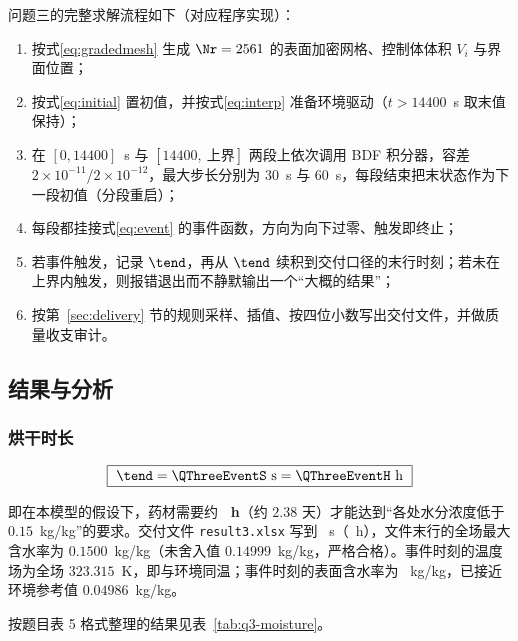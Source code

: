 问题三的完整求解流程如下（对应程序实现）：

\begin{enumerate}
  \item 按式\eqref{eq:gradedmesh} 生成 $\Nr=2561$ 的表面加密网格、控制体体积 $V_i$ 与界面位置；
  \item 按式\eqref{eq:initial} 置初值，并按式\eqref{eq:interp} 准备环境驱动（$t>14400$~s 取末值保持）；
  \item 在 $[0,14400]$~s 与 $[14400,\ \text{上界}]$ 两段上依次调用 BDF 积分器，容差 $2\times10^{-11}$/$2\times10^{-12}$，最大步长分别为 $30$~s 与 $60$~s，每段结束把末状态作为下一段初值（分段重启）；
  \item 每段都挂接式\eqref{eq:event} 的事件函数，方向为向下过零、触发即终止；
  \item 若事件触发，记录 $\tend$，再从 $\tend$ 续积到交付口径的末行时刻；若未在上界内触发，则报错退出而不静默输出一个``大概的结果''；
  \item 按第~\ref{sec:delivery} 节的规则采样、插值、按四位小数写出交付文件，并做质量收支审计。
\end{enumerate}

\subsection{结果与分析}
\label{sec:q3result}

\subsubsection{烘干时长}

\begin{equation}
\boxed{\ \tend=\QThreeEventS~\mathrm{s}=\QThreeEventH~\mathrm{h}\ }
\end{equation}

即在本模型的假设下，药材需要约 \textbf{\QThreeEventH~h}（约 $2.38$ 天）才能达到``各处水分浓度低于 $0.15$~kg/kg''的要求。交付文件 \texttt{result3.xlsx} 写到 \QThreeLastRowS~s（\QThreeLastRowH~h），文件末行的全场最大含水率为 $0.1500$~kg/kg（未舍入值 $0.14999$~kg/kg，严格合格）。事件时刻的温度场为全场 $323.315$~K，即与环境同温；事件时刻的表面含水率为 \QThreeSurfaceEnd~kg/kg，已接近环境参考值 $0.04986$~kg/kg。

按题目表 5 格式整理的结果见表~\ref{tab:q3-moisture}。


